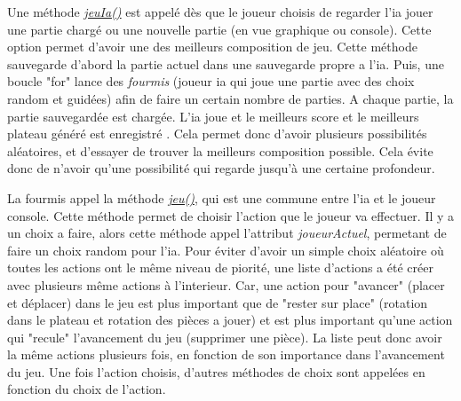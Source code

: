         Une méthode \underline{\textit{jeuIa()}} est appelé dès que le joueur choisis de regarder l'ia jouer une partie chargé ou une nouvelle partie (en vue graphique ou console). Cette option permet d'avoir une des meilleurs composition de jeu.
        Cette méthode sauvegarde d'abord la partie actuel dans une sauvegarde propre a l'ia. Puis, une boucle "for" lance des \textit{fourmis} (joueur ia qui joue une partie avec des choix random et guidées) afin de faire un certain nombre de parties. A chaque partie, la partie sauvegardée est chargée. L'ia joue et le meilleurs score et le meilleurs plateau généré est enregistré . Cela permet donc d'avoir plusieurs possibilités aléatoires, et d'essayer de trouver la meilleurs composition possible. Cela évite donc de n'avoir qu'une possibilité qui regarde jusqu'à une certaine profondeur.

        La fourmis appel la méthode \underline{\textit{jeu()}}, qui est une commune entre l'ia et le joueur console. Cette méthode permet de choisir l'action que le joueur va effectuer. Il y a un choix a faire, alors cette méthode appel l'attribut \textit{joueurActuel}, permetant de faire un choix random pour l'ia. Pour éviter d'avoir un simple choix aléatoire où toutes les actions ont le même niveau de piorité, une liste d'actions a été créer avec plusieurs même actions à l'interieur. Car, une action pour "avancer" (placer et déplacer) dans le jeu est plus important que de "rester sur place" (rotation dans le plateau et rotation des pièces a jouer) et est plus important qu'une action qui "recule" l'avancement du jeu (supprimer une pièce). La liste peut donc avoir la même actions plusieurs fois, en fonction de son importance dans l'avancement du jeu. Une fois l'action choisis, d'autres méthodes de choix sont appelées en fonction du choix de l'action.

